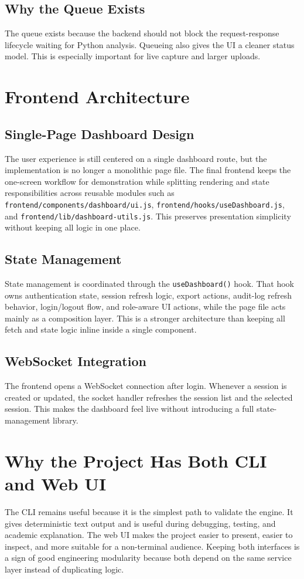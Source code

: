 \documentclass[12pt,a4paper]{report}
\begin{document}
\section{Why the Queue Exists}
The queue exists because the backend should not block the request-response lifecycle waiting for Python analysis. Queueing also gives the UI a cleaner status model. This is especially important for live capture and larger uploads.

\chapter{Frontend Architecture}
\section{Single-Page Dashboard Design}
The user experience is still centered on a single dashboard route, but the implementation is no longer a monolithic page file. The final frontend keeps the one-screen workflow for demonstration while splitting rendering and state responsibilities across reusable modules such as \texttt{frontend/components/dashboard/ui.js}, \texttt{frontend/hooks/useDashboard.js}, and \texttt{frontend/lib/dashboard-utils.js}. This preserves presentation simplicity without keeping all logic in one place.

\section{State Management}
State management is coordinated through the \texttt{useDashboard()} hook. That hook owns authentication state, session refresh logic, export actions, audit-log refresh behavior, login/logout flow, and role-aware UI actions, while the page file acts mainly as a composition layer. This is a stronger architecture than keeping all fetch and state logic inline inside a single component.

\section{WebSocket Integration}
The frontend opens a WebSocket connection after login. Whenever a session is created or updated, the socket handler refreshes the session list and the selected session. This makes the dashboard feel live without introducing a full state-management library.

\chapter{Why the Project Has Both CLI and Web UI}
The CLI remains useful because it is the simplest path to validate the engine. It gives deterministic text output and is useful during debugging, testing, and academic explanation. The web UI makes the project easier to present, easier to inspect, and more suitable for a non-terminal audience. Keeping both interfaces is a sign of good engineering modularity because both depend on the same service layer instead of duplicating logic.
\end{document}

